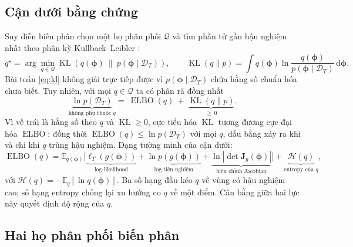 \documentclass[12pt,a4paper]{article}
\numberwithin{equation}{section}
\theoremstyle{definition}
\newcommand{\E}{\mathbb{E}}
\newcommand{\KL}{\operatorname{KL}}
\newcommand{\ELBO}{\operatorname{ELBO}}
\newcommand{\Data}{\mathcal{D}}
\newcommand{\vecphi}{\symbf{\phi}}
\newcommand{\diff}{\mathrm{d}}
\begin{document}
\subsection{Cận dưới bằng chứng}\label{subsec:elbo}
Suy diễn biến phân chọn một họ phân phối $\mathcal{Q}$ và tìm phần tử gần hậu nghiệm nhất
theo phân kỳ Kullback--Leibler \cite{blei2017}:
\begin{equation}
  q^{\star}=\arg\min_{q\in\mathcal{Q}}
  \KL\!\left(q(\vecphi)\ \|\ p(\vecphi\mid\Data_T)\right),
  \qquad
  \KL\!\left(q\|p\right)=\int q(\vecphi)\ln\frac{q(\vecphi)}{p(\vecphi\mid\Data_T)}\,\diff\vecphi.
  \label{eq:kl}
\end{equation}
Bài toán \eqref{eq:kl} không giải trực tiếp được vì $p(\vecphi\mid\Data_T)$ chứa hằng số
chuẩn hóa chưa biết. Tuy nhiên, với mọi $q\in\mathcal{Q}$ ta có phân rã đồng nhất
\begin{equation}
  \underbrace{\ln p(\Data_T)}_{\text{không phụ thuộc }q}
  =\ \ELBO(q)\ +\ \underbrace{\KL\!\left(q\|p\right)}_{\ge\,0}.
  \label{eq:elbo-decomposition}
\end{equation}
Vì vế trái là hằng số theo $q$ và $\KL\ge 0$, cực tiểu hóa $\KL$ tương đương cực đại hóa
$\ELBO$; đồng thời $\ELBO(q)\le\ln p(\Data_T)$ với mọi $q$, dấu bằng xảy ra khi và chỉ
khi $q$ trùng hậu nghiệm. Dạng tường minh của cận dưới:
\begin{equation}
  \ELBO(q)=\E_{q(\vecphi)}\!\Big[
  \underbrace{\ell_T\!\left(g(\vecphi)\right)}_{\text{log-likelihood}}
  +\underbrace{\ln p\!\left(g(\vecphi)\right)}_{\text{log-tiên nghiệm}}
  +\underbrace{\ln\left|\det\symbf J_g(\vecphi)\right|}_{\text{hiệu chỉnh Jacobian}}
  \Big]
  +\underbrace{\mathcal{H}(q)}_{\text{entropy của }q},
  \label{eq:elbo}
\end{equation}
với $\mathcal{H}(q)=-\E_q[\ln q(\vecphi)]$. Ba số hạng đầu kéo $q$ về vùng có hậu nghiệm
cao; số hạng entropy chống lại xu hướng co $q$ về một điểm. Cân bằng giữa hai lực này
quyết định độ rộng của $q$.

\subsection{Hai họ phân phối biến phân}\label{subsec:families}
\end{document}
